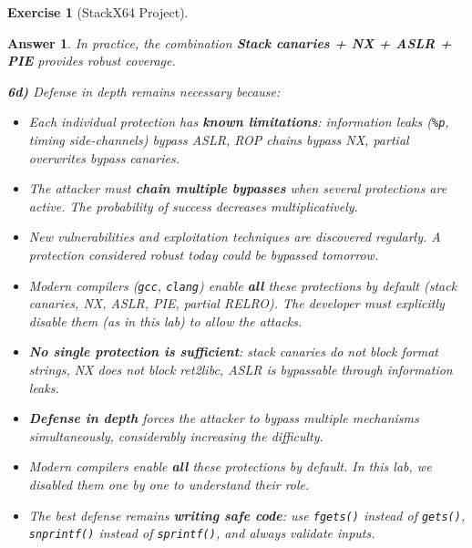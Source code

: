 \documentclass[a4paper,11pt]{article}
\theoremstyle{plain}
\newtheorem{correction}{Answer}
\theoremstyle{definition}
\newtheorem{exercice}{Exercise}
\begin{document}
\begin{exercice}[StackX64 Project]
\begin{correction}
In practice, the combination \textbf{Stack canaries + NX + ASLR + PIE} provides robust coverage.

\textbf{6d)} Defense in depth remains necessary because:
\begin{itemize}
    \item Each individual protection has \textbf{known limitations}: information leaks (\texttt{\%p}, timing side-channels) bypass ASLR, ROP chains bypass NX, partial overwrites bypass canaries.
    \item The attacker must \textbf{chain multiple bypasses} when several protections are active. The probability of success decreases multiplicatively.
    \item New vulnerabilities and exploitation techniques are discovered regularly. A protection considered robust today could be bypassed tomorrow.
    \item Modern compilers (\texttt{gcc}, \texttt{clang}) enable \textbf{all} these protections by default (stack canaries, NX, ASLR, PIE, partial RELRO). The developer must explicitly disable them (as in this lab) to allow the attacks.
\end{itemize}

\begin{pointcle}
\begin{itemize}
    \item \textbf{No single protection is sufficient}: stack canaries do not block format strings, NX does not block ret2libc, ASLR is bypassable through information leaks.
    \item \textbf{Defense in depth} forces the attacker to bypass multiple mechanisms simultaneously, considerably increasing the difficulty.
    \item Modern compilers enable \textbf{all} these protections by default. In this lab, we disabled them one by one to understand their role.
    \item The best defense remains \textbf{writing safe code}: use \texttt{fgets()} instead of \texttt{gets()}, \texttt{snprintf()} instead of \texttt{sprintf()}, and always validate inputs.
\end{itemize}
\end{pointcle}

\end{correction}

\end{exercice}
\end{document}
